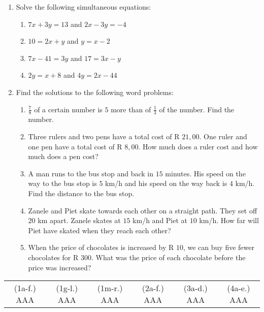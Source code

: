 \begin{eocexercises}{}
\begin{enumerate}[itemsep=5pt, label=\textbf{\arabic*}. ]
\item Solve the following simultaneous equations:
\begin{enumerate}[itemsep=5pt,label=\textbf{(\alph*)}]
\item $7x+3y=13$ and $2x-3y=-4$  
\item $10=2x+y$ and $y=x-2$
\item $7x-41=3y$ and $17=3x-y$
\item $2y=x+8$ and $4y=2x-44$
\end{enumerate}

\item Find the solutions to the following word problems:
\begin{enumerate}[itemsep=5pt,label=\textbf{(\alph*)}]
\item $\frac{7}{8}$ of a certain number is $5$ more than of $\frac{1}{3}$ of the number. Find the number.
\item Three rulers and two pens have a total cost of R $21,00$. One ruler and one pen have a total cost of R $8,00$. How much does a ruler cost and how much does a pen cost? 
\item A man runs to the bus stop and back in $15$ minutes. His speed on the way to the bus stop is $5$ km/h and his speed on the way back is $4$ km/h. Find the distance to the bus stop.
\item Zanele and Piet skate towards each other on a straight path. They set off $20$ km apart. Zanele skates at $15$ km/h and Piet at $10$ km/h. How far will Piet have skated when they reach each other?
\item When the price of chocolates is increased by R $10$, we can buy five fewer chocolates for R $300$. What was the price of each chocolate before the price was increased?
   

\end{enumerate}
\end{enumerate}
\practiceinfo
\par 
\par \begin{tabular}[h]{cccccc} 
(1a-f.) AAA  &  (1g-l.) AAA & (1m-r.) AAA  &  (2a-f.) AAA  &  (3a-d.) AAA  &  (4a-e.) AAA \end{tabular}

\end{eocexercises}
